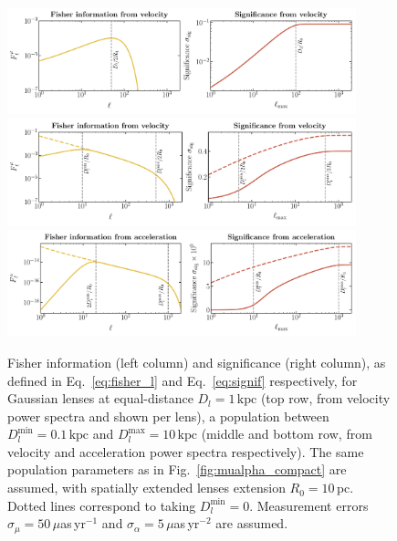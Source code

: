 \documentclass[prd,aps,10pt,nofootinbib,twocolumn,superscriptaddress,preprintnumbers,balancelastpage,longbibliography]{revtex4-1}
\begin{document}
\begin{figure}[htbp]
  \centering
  \includegraphics[width=0.9\textwidth]{plots/fisher_mu_single}
  \includegraphics[width=0.9\textwidth]{plots/fisher_mu}
  \includegraphics[width=0.9\textwidth]{plots/fisher_alpha}
  \caption{Fisher information (left column) and significance (right column), as defined in Eq.~\ref{eq:fisher_l} and Eq.~\ref{eq:signif} respectively, for Gaussian lenses at equal-distance $D_l=1\,\mathrm{kpc}$ (top row, from velocity power spectra and shown per lens), a population between $D_{l}^{\mathrm{min}}=0.1\,\mathrm{kpc}$ and $D_{l}^{\mathrm{max}}=10\,\mathrm{kpc}$ (middle and bottom row, from velocity and acceleration power spectra respectively). The same population parameters as in Fig.~\ref{fig:mualpha_compact} are assumed, with spatially extended lenses extension $R_0=10$\,pc. Dotted lines correspond to taking $D_l^\mathrm{min}=0$. Measurement errors $\sigma_\mu=50\,\mu$as\,yr$^{-1}$ and $\sigma_\alpha=5\,\mu$as\,yr$^{-2}$ are assumed.} 
  \label{fig:fisher_sig}
\end{figure}
\end{document}
